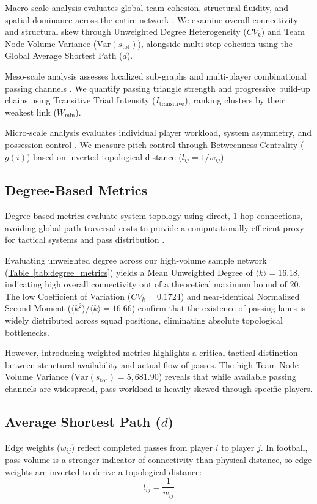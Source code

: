 \documentclass[12pt, a4paper]{article}
\begin{document}
Macro-scale analysis evaluates global team cohesion, structural fluidity, and spatial dominance across the entire network \cite{watts1998collective, cintia2015network}. We examine overall connectivity and structural skew through Unweighted Degree Heterogeneity ($CV_k$) and Team Node Volume Variance ($\text{Var}(s_{\text{tot}})$), alongside multi-step cohesion using the Global Average Shortest Path ($d$).

Meso-scale analysis assesses localized sub-graphs and multi-player combinational passing channels \cite{pena2015can}. We quantify passing triangle strength and progressive build-up chains using Transitive Triad Intensity ($I_{\text{transitive}}$), ranking clusters by their weakest link ($W_{\text{min}}$).

Micro-scale analysis evaluates individual player workload, system asymmetry, and possession control \cite{pena2012network, buldu2019}. We measure pitch control through Betweenness Centrality ($g(i)$) based on inverted topological distance ($l_{ij} = 1/w_{ij}$).

\subsection{Degree-Based Metrics}
\label{subsec:degree_metrics}
Degree-based metrics evaluate system topology using direct, 1-hop connections, avoiding global path-traversal costs to provide a computationally efficient proxy for tactical systems and pass distribution \cite{narizuka2014statistical}.

Evaluating unweighted degree across our high-volume sample network (\hyperref[tab:degree_metrics]{Table~\ref{tab:degree_metrics}}) yields a Mean Unweighted Degree of $\langle k \rangle = 16.18$, indicating high overall connectivity out of a theoretical maximum bound of 20. The low Coefficient of Variation ($CV_k = 0.1724$) and near-identical Normalized Second Moment ($\langle k^2 \rangle / \langle k \rangle = 16.66$) confirm that the existence of passing lanes is widely distributed across squad positions, eliminating absolute topological bottlenecks.

However, introducing weighted metrics highlights a critical tactical distinction between structural availability and actual flow of passes. The high Team Node Volume Variance ($\text{Var}(s_{\text{tot}}) = 5,681.90$) reveals that while available passing channels are widespread, pass workload is heavily skewed through specific players.

\newpage
\subsection{Average Shortest Path ($d$)}
\label{subsec:asp}
Edge weights ($w_{ij}$) reflect completed passes from player $i$ to player $j$. In football, pass volume is a stronger indicator of connectivity than physical distance, so edge weights are inverted to derive a topological distance:
\begin{equation}
    l_{ij} = \frac{1}{w_{ij}}
\end{equation}
\end{document}
